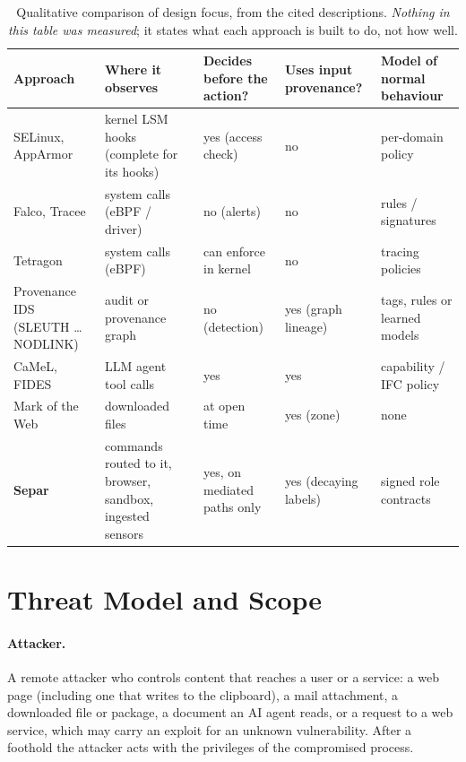 \documentclass[10pt,twocolumn,letterpaper]{article}
\begin{document}
\begin{table}[t]
\centering\small
\caption{Qualitative comparison of design focus, from the cited descriptions. \emph{Nothing in
this table was measured}; it states what each approach is built to do, not how well.}
\label{tab:qualitative}
\begin{tabularx}{\textwidth}{@{}lXXXX@{}}
\toprule
\textbf{Approach} & \textbf{Where it observes} & \textbf{Decides before the action?} & \textbf{Uses input provenance?} & \textbf{Model of normal behaviour} \\
\midrule
SELinux, AppArmor & kernel LSM hooks (complete for its hooks) & yes (access check) & no & per-domain policy \\
Falco, Tracee & system calls (eBPF / driver) & no (alerts) & no & rules / signatures \\
Tetragon & system calls (eBPF) & can enforce in kernel & no & tracing policies \\
Provenance IDS (SLEUTH \ldots{} NODLINK) & audit or provenance graph & no (detection) & yes (graph lineage) & tags, rules or learned models \\
CaMeL, FIDES & LLM agent tool calls & yes & yes & capability / IFC policy \\
Mark of the Web & downloaded files & at open time & yes (zone) & none \\
\textbf{Separ} & commands routed to it, browser, sandbox, ingested sensors & yes, on mediated paths only & yes (decaying labels) & signed role contracts \\
\bottomrule
\end{tabularx}
\end{table}

\section{Threat Model and Scope}
\label{sec:threat}

\paragraph{Attacker.} A remote attacker who controls content that reaches a user or a service: a
web page (including one that writes to the clipboard), a mail attachment, a downloaded file or
package, a document an AI agent reads, or a request to a web service, which may carry an exploit
for an unknown vulnerability. After a foothold the attacker acts with the privileges of the
compromised process.
\end{document}
